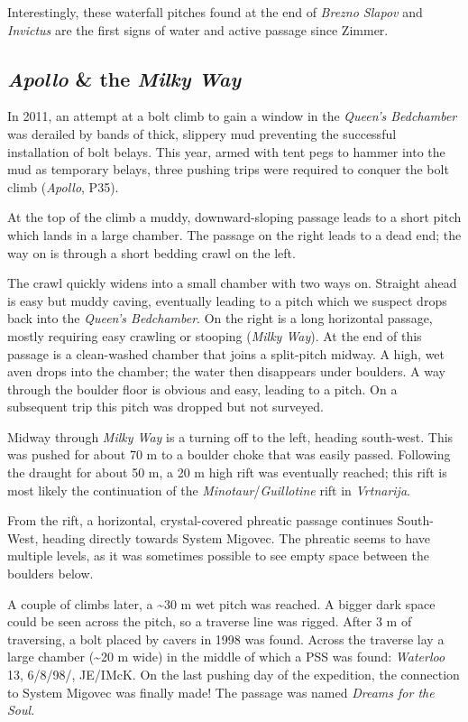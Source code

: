 Interestingly, these waterfall pitches found at the end of \emph{Brezno
Slapov} and \emph{Invictus} are the first signs of water and active
passage since Zimmer.


\subsection{\texorpdfstring{\emph{Apollo} \& the \emph{Milky
Way}}{Apollo \& the Milky Way}}

In 2011, an attempt at a bolt climb to gain a window in the
\emph{Queen's Bedchamber} was derailed by bands of thick, slippery mud
preventing the successful installation of bolt belays. This year, armed
with tent pegs to hammer into the mud as temporary belays, three pushing
trips were required to conquer the bolt climb (\emph{Apollo}, P35).

At the top of the climb a muddy, downward-sloping passage leads to a
short pitch which lands in a large chamber. The passage on the right
leads to a dead end; the way on is through a short bedding crawl on the
left.

The crawl quickly widens into a small chamber with two ways on. Straight
ahead is easy but muddy caving, eventually leading to a pitch which we
suspect drops back into the \emph{Queen's Bedchamber}. On the right is a
long horizontal passage, mostly requiring easy crawling or stooping
(\emph{Milky Way}). At the end of this passage is a clean-washed chamber
that joins a split-pitch midway. A high, wet aven drops into the
chamber; the water then disappears under boulders. A way through the
boulder floor is obvious and easy, leading to a pitch. On a subsequent
trip this pitch was dropped but not surveyed.

Midway through \emph{Milky Way} is a turning off to the left, heading
south-west. This was pushed for about 70 m to a boulder choke that was
easily passed. Following the draught for about 50 m, a 20 m high rift
was eventually reached; this rift is most likely the continuation of the
\emph{Minotaur}/\emph{Guillotine} rift in \emph{Vrtnarija}.

From the rift, a horizontal, crystal-covered phreatic passage continues
South-West, heading directly towards System Migovec. The phreatic seems
to have multiple levels, as it was sometimes possible to see empty space
between the boulders below.

A couple of climbs later, a \textasciitilde 30 m wet pitch was reached.
A bigger dark space could be seen across the pitch, so a traverse line
was rigged. After 3 m of traversing, a bolt placed by cavers in 1998 was
found. Across the traverse lay a large chamber (\textasciitilde 20 m
wide) in the middle of which a PSS was found: \emph{Waterloo} 13,
6/8/98/, JE/IMcK. On the last pushing day of the expedition, the
connection to System Migovec was finally made! The passage was named
\emph{Dreams for the Soul}.

